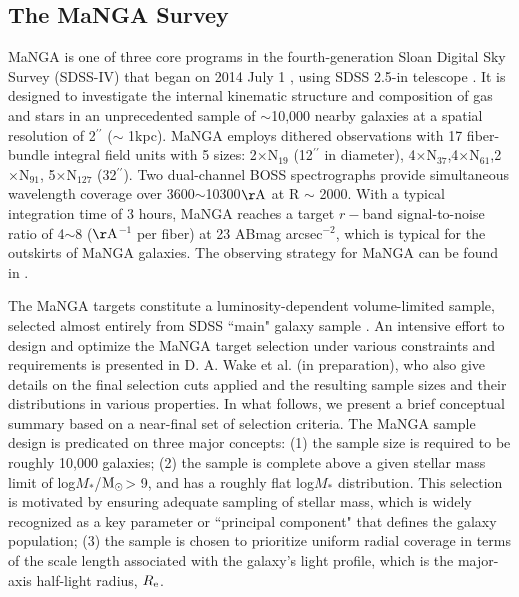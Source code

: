 \documentclass[a4paper,fleqn,usenatbib]{mnras}
\newcommand{\msun}{$\rm M_\odot$}
\newcommand{\mstar}{$M_*$}
\begin{document}
\subsection{The MaNGA Survey}
MaNGA is one of three core programs in the fourth-generation Sloan Digital Sky Survey (SDSS-IV) 
that began on 2014 July 1 \citep{bundy-15, drory-2015, yan-2016}, using SDSS 2.5-in telescope \citep{gunn-2006}. It is designed to investigate the internal kinematic structure and composition 
of gas and stars in an unprecedented sample of $\sim$10,000 nearby galaxies at a spatial resolution of 2$^{\prime\prime}$ ($\sim$ 1kpc). MaNGA employs dithered 
observations with 17 fiber-bundle integral field units with 5 sizes: 2$\times$N$_{19}$ (12$^{\prime\prime}$ in diameter),
4$\times$N$_{37}$,4$\times$N$_{61}$,2$\times$N$_{91}$, 5$\times$N$_{127}$ (32$^{\prime\prime}$). 
Two dual-channel BOSS spectrographs \citep{smee-2013} provide simultaneous wavelength coverage 
over 3600$\sim$10300$\rm \AA$ at R $\sim$ 2000. 
With a typical integration time of 3 hours, MaNGA reaches a target 
$r-$band signal-to-noise ratio of 4$\sim$8 ($\rm \AA$$^{-1}$ per fiber) at 23 ABmag arcsec$^{-2}$, which is typical for 
the outskirts of MaNGA galaxies.  The observing strategy for MaNGA can be found in \cite{Law-15}.

The MaNGA targets constitute a luminosity-dependent volume-limited sample, selected 
almost entirely from SDSS ``main" galaxy sample \citep{strauss-2002}. An intensive effort to design and optimize the 
MaNGA target selection under various constraints and requirements is presented in D. A. Wake et al. 
(in preparation), who also give details on the final selection cuts applied and the resulting sample sizes 
and their distributions in various properties. In what follows, we present a brief conceptual summary 
based on a near-final set of selection criteria. The MaNGA sample design is predicated on three major 
concepts: (1) the sample size is required to be roughly 10,000 galaxies; (2) the sample is complete 
above a given stellar mass limit of log\mstar/\msun > 9, and has a roughly flat log$M_*$ distribution. 
This selection is motivated by ensuring adequate sampling of stellar mass, which is widely recognized as a key parameter or 
``principal component" that defines the galaxy population; (3) the sample is chosen to prioritize uniform radial coverage in 
terms of the scale length associated with the galaxy's light profile, which is the major-axis 
half-light radius, $R_{\rm e}$. 
\end{document}
